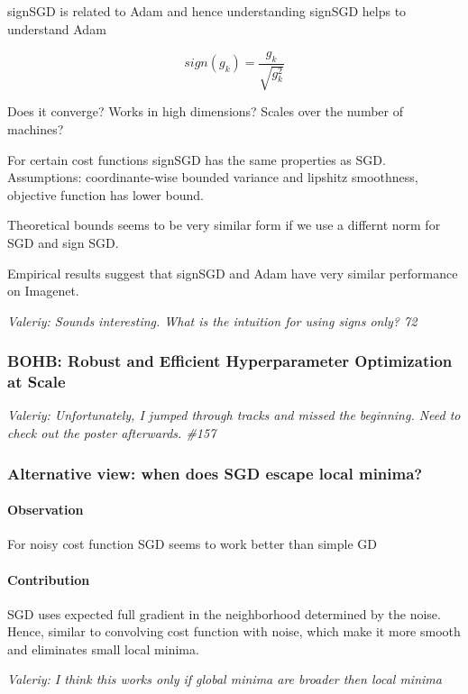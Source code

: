 \documentclass[11pt,oneside,a4paper]{scrartcl}
\newcommand{\valeriy}[1]{{\color{blue}\textit{Valeriy: #1}}}
\begin{document}
signSGD is related to Adam and hence understanding signSGD helps to
understand Adam

$$sign(g_k) = \frac{g_k}{\sqrt{g_k^2}}$$

Does it converge?  Works in high dimensions? Scales over the number of
machines?

For certain cost functions signSGD has the same properties as SGD.
Assumptions: coordinante-wise bounded variance and lipshitz
smoothness, objective function has lower bound.

Theoretical bounds seems to be very similar form if we use a differnt norm
for SGD and sign SGD.

Empirical results suggest that signSGD and Adam have very similar
performance on Imagenet.

\valeriy{Sounds interesting. What is the intuition for using signs
  only? 72}



\subsubsection{BOHB: Robust and Efficient Hyperparameter Optimization
  at Scale \cite{falkner18a}}
\label{sec:bohb:-robust-effic}


\valeriy{Unfortunately, I jumped through tracks and missed the
  beginning. Need to check out the poster afterwards. \#157}



\subsubsection{Alternative view: when does SGD escape local minima? \cite{kleinberg18a}}
\label{sec:when-does-sgd}

\paragraph{Observation}
For noisy cost function SGD seems to work better than simple GD

\paragraph{Contribution}
SGD uses expected full gradient in the neighborhood determined by the
noise. Hence, similar to convolving cost function with noise,
which make it more smooth and eliminates small local minima.

\valeriy{I think this works only if global minima are broader then local minima}
\end{document}
